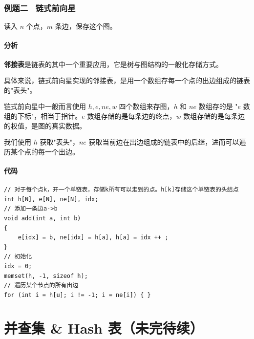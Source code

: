 \documentclass{report}
\begin{document}
\subsection{例题二 \ 链式前向星}

读入 $n$ 个点，$m$ 条边，保存这个图。

\subsubsection{分析}

\textbf{邻接表}是链表的其中一个重要应用，它是树与图结构的一般化存储方式。

具体来说，链式前向星实现的邻接表，是用一个数组存每一个点的出边组成的链表的"表头"。

链式前向星中一般而言使用 $h, e, ne, w$ 四个数组来存图，$h$ 和 $ne$ 数组存的是 "$e$ 数组的下标"，相当于指针。$e$ 数组存储的是每条边的终点，$w$ 数组存储的是每条边的权值，是图的真实数据。

我们使用 $h$ 获取"表头"，$ne$ 获取当前边在出边组成的链表中的后继，进而可以遍历某个点的每一个出边。

\subsubsection{代码}

\begin{verbatim}
// 对于每个点k，开一个单链表，存储k所有可以走到的点。h[k]存储这个单链表的头结点
int h[N], e[N], ne[N], idx;
// 添加一条边a->b
void add(int a, int b)
{
    e[idx] = b, ne[idx] = h[a], h[a] = idx ++ ;
}
// 初始化
idx = 0;
memset(h, -1, sizeof h);
// 遍历某个节点的所有出边
for (int i = h[u]; i != -1; i = ne[i]) { }
\end{verbatim}

\chapter{并查集 \& Hash 表（未完待续）}
\end{document}
